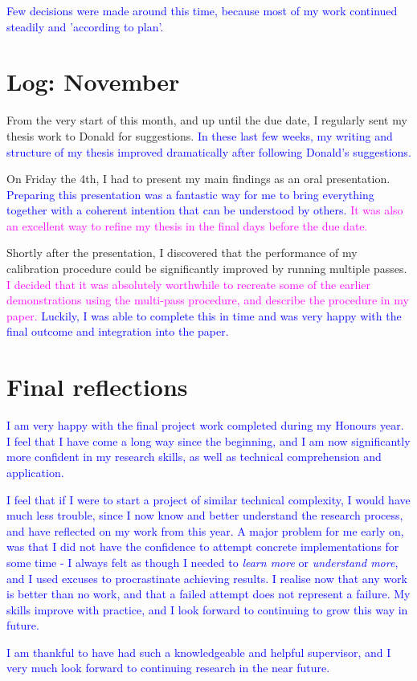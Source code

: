 \documentclass[a4paper, 12pt]{article}
\begin{document}
\textcolor{Blue}{Few decisions were made around this time, because most of my work continued steadily and 'according to plan'.} 

\section{Log: November}
From the very start of this month, and up until the due date, I regularly sent my thesis work to Donald for suggestions. \textcolor{Blue}{In these last few weeks, my writing and structure of my thesis improved dramatically after following Donald's suggestions.} 

On Friday the 4th, I had to present my main findings as an oral presentation. \textcolor{Blue}{Preparing this presentation was a fantastic way for me to bring everything together with a coherent intention that can be understood by others.} \textcolor{Magenta}{It was also an excellent way to refine my thesis in the final days before the due date.}

Shortly after the presentation, I discovered that the performance of my calibration procedure could be significantly improved by running multiple passes. \textcolor{Magenta}{I decided that it was absolutely worthwhile to recreate some of the earlier demonstrations using the multi-pass procedure, and describe the procedure in my paper.} \textcolor{Blue}{Luckily, I was able to complete this in time and was very happy with the final outcome and integration into the paper.}

\newpage
\section{Final reflections}
\textcolor{Blue}{I am very happy with the final project work completed during my Honours year. I feel that I have come a long way since the beginning, and I am now significantly more confident in my research skills, as well as technical comprehension and application.}

\textcolor{Blue}{I feel that if I were to start a project of similar technical complexity, I would have much less trouble, since I now know and better understand the research process, and have reflected on my work from this year. A major problem for me early on, was that I did not have the confidence to attempt concrete implementations for some time - I always felt as though I needed to \emph{learn more} or \emph{understand more}, and I used excuses to procrastinate achieving results. I realise now that any work is better than no work, and that a failed attempt does not represent a failure. My skills improve with practice, and I look forward to continuing to grow this way in future.}

\textcolor{Blue}{I am thankful to have had such a knowledgeable and helpful supervisor, and I very much look forward to continuing research in the near future.}
\end{document}
